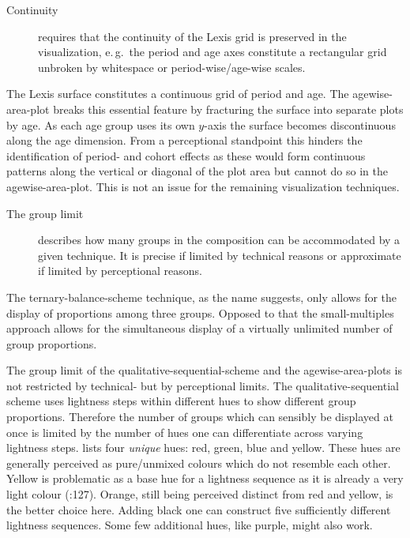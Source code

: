 \documentclass[parskip=half]{scrartcl}
\begin{document}
\begin{description}
  \item[Continuity] requires that the continuity of the Lexis grid is preserved in the visualization, e.\,g.~the period and age axes constitute a rectangular grid unbroken by whitespace or period-wise/age-wise scales.
\end{description}

The Lexis surface constitutes a continuous grid of period and age. The agewise-area-plot breaks this essential feature by fracturing the surface into separate plots by age. As each age group uses its own $y$-axis the surface becomes discontinuous along the age dimension. From a perceptional standpoint this hinders the identification of period- and cohort effects as these would form continuous patterns along the vertical or diagonal of the plot area but cannot do so in the agewise-area-plot. This is not an issue for the remaining visualization techniques.

\begin{description}
  \item[The group limit] describes how many groups in the composition can be accommodated by a given technique. It is precise if limited by technical reasons or approximate if limited by perceptional reasons.
\end{description}

The ternary-balance-scheme technique, as the name suggests, only allows for the display of proportions among three groups. Opposed to that the small-multiples approach allows for the simultaneous display of a virtually unlimited number of group proportions.

The group limit of the qualitative-sequential-scheme and the agewise-area-plots is not restricted by technical- but by perceptional limits. The qualitative-sequential scheme uses lightness steps within different hues to show different group proportions. Therefore the number of groups which can sensibly be displayed at once is limited by the number of hues one can differentiate across varying lightness steps. \textcite{Ware2013} lists four \emph{unique} hues: red, green, blue and yellow. These hues are generally perceived as pure/unmixed colours which do not resemble each other. Yellow is problematic as a base hue for a lightness sequence as it is already a very light colour (\cite{Ware2013}:127). Orange, still being perceived distinct from red and yellow, is the better choice here. Adding black one can construct five sufficiently different lightness sequences. Some few additional hues, like purple, might also work.
\end{document}
